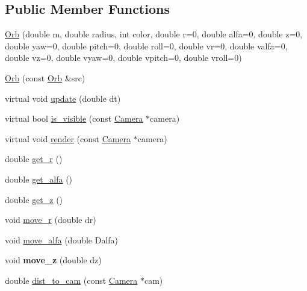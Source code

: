 \subsection*{Public Member Functions}
\begin{DoxyCompactItemize}
\item 
\hyperlink{class_orb_a3407825c339b82eaff3b59738670350a}{Orb} (double m, double radius, int color, double r=0, double alfa=0, double z=0, double yaw=0, double pitch=0, double roll=0, double vr=0, double valfa=0, double vz=0, double vyaw=0, double vpitch=0, double vroll=0)
\item 
\hyperlink{class_orb_adeeb210501049c0d1a2e1a5c4761c8c8}{Orb} (const \hyperlink{class_orb}{Orb} \&src)
\item 
virtual void \hyperlink{class_orb_a23637b6caf496f4932e21935edbd1b74}{update} (double dt)
\item 
virtual bool \hyperlink{class_orb_af96db026919a527193c96331444a04df}{is\+\_\+visible} (const \hyperlink{class_camera}{Camera} $\ast$camera)
\item 
virtual void \hyperlink{class_orb_ade7e6c6c2a991d91c2420581996e0b17}{render} (const \hyperlink{class_camera}{Camera} $\ast$camera)
\item 
double \hyperlink{class_orb_a5b6bfbf0f482b6876458c208c762c5f6}{get\+\_\+r} ()
\item 
double \hyperlink{class_orb_a2da0c0c6302143398ae204ad2a13d17f}{get\+\_\+alfa} ()
\item 
double \hyperlink{class_orb_a01147493b605751d3176faf78ec97f0d}{get\+\_\+z} ()
\item 
void \hyperlink{class_orb_a365261dff002736017e9fc0d346e2fbf}{move\+\_\+r} (double dr)
\item 
void \hyperlink{class_orb_ada00a09e2184aff67aba54c5cbf9d276}{move\+\_\+alfa} (double Dalfa)
\item 
void {\bfseries move\+\_\+z} (double dz)\hypertarget{class_orb_af25337025d9e1698689d395e22bad4e8}{}\label{class_orb_af25337025d9e1698689d395e22bad4e8}

\item 
double \hyperlink{class_orb_ab960dd2ce7a33bc4ec53a84780885085}{dist\+\_\+to\+\_\+cam} (const \hyperlink{class_camera}{Camera} $\ast$cam)
\end{DoxyCompactItemize}
